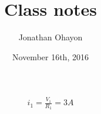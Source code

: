 \documentclass[11pt, oneside]{article}
\title{Class notes}
\author{Jonathan Ohayon}
\date{November 16th, 2016}
\begin{document}
\maketitle

\begin{equation}
\begin{split}
i_1 = \frac{V_1}{R_1} = 3A \\
\end{split}
\end{equation}
\end{document}

